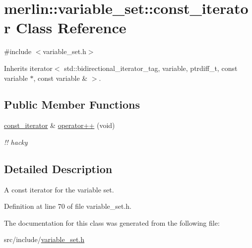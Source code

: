 \hypertarget{classmerlin_1_1variable__set_1_1const__iterator}{}\section{merlin\+:\+:variable\+\_\+set\+:\+:const\+\_\+iterator Class Reference}
\label{classmerlin_1_1variable__set_1_1const__iterator}


{\ttfamily \#include $<$variable\+\_\+set.\+h$>$}



Inherits iterator$<$ std\+::bidirectional\+\_\+iterator\+\_\+tag, variable, ptrdiff\+\_\+t, const variable $\ast$, const variable \& $>$.

\subsection*{Public Member Functions}
\begin{DoxyCompactItemize}
\item 
\hyperlink{classmerlin_1_1variable__set_1_1const__iterator}{const\+\_\+iterator} \& \hyperlink{classmerlin_1_1variable__set_1_1const__iterator_abcb1fb8ed01562696aba64ebf2cc0e68}{operator++} (void)\hypertarget{classmerlin_1_1variable__set_1_1const__iterator_abcb1fb8ed01562696aba64ebf2cc0e68}{}\label{classmerlin_1_1variable__set_1_1const__iterator_abcb1fb8ed01562696aba64ebf2cc0e68}

\begin{DoxyCompactList}\small\item\em !! hacky \end{DoxyCompactList}\end{DoxyCompactItemize}


\subsection{Detailed Description}
A const iterator for the variable set. 

Definition at line 70 of file variable\+\_\+set.\+h.



The documentation for this class was generated from the following file\+:\begin{DoxyCompactItemize}
\item 
src/include/\hyperlink{variable__set_8h}{variable\+\_\+set.\+h}\end{DoxyCompactItemize}

